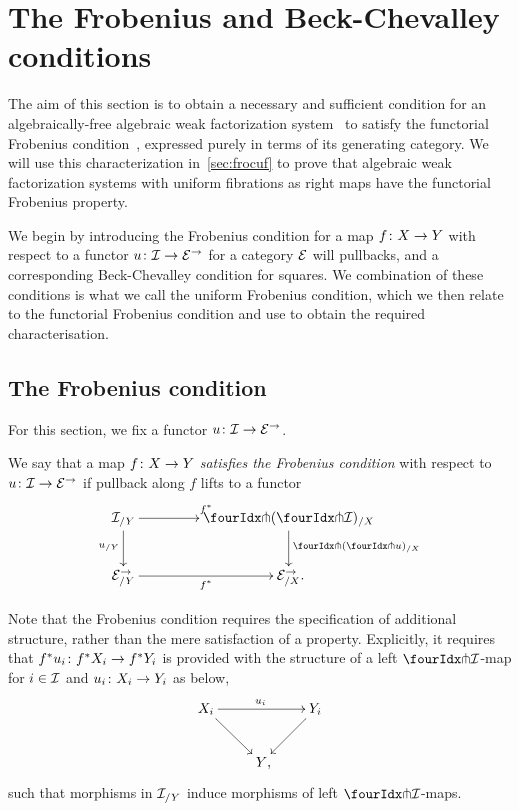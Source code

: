 \documentclass[reqno,10pt,a4paper,oneside,draft]{amsart}
\begin{document}
\section{The Frobenius and Beck-Chevalley conditions}
\label{sec:frobc}


The aim of this section is to obtain a necessary and sufficient condition for an algebraically-free algebraic weak
factorization system~\cite{garner:small-object-argument} to satisfy the functorial Frobenius condition~\cite{garner:topological-simplicial}, expressed purely in terms of its generating category. We will use this characterization 
in~\cref{sec:frocuf} to prove that algebraic weak factorization systems with uniform fibrations as right maps
have the functorial Frobenius property. 

We begin by introducing the Frobenius condition for a map $f \co X \to Y$ with respect to a functor $u \co \cal{I} \to \catE^\to$ for a category $\cal{E}$ will pullbacks, and a corresponding Beck-Chevalley condition for squares. We combination of these conditions is what we call the uniform Frobenius condition, which we then relate to the functorial Frobenius
condition and use to obtain the required characterisation. 


\subsection*{The Frobenius condition}

For this section, we fix a functor $u \co \cal{I} \to \catE^\to$.

\begin{definition} \label{thm:frobenius-def}
We say that a map $f \co X \to Y$ \emph{satisfies the Frobenius condition} with respect to $u \co \cal{I} \to \cal{E}^\to$ if pullback along $f$ lifts to a functor
\[
\xymatrix@C=1.5cm{
  \cal{I}_{/Y}
  \ar[r]^{f^*}
  \ar[d]_{u_{/Y}}
&
  \liftl{(\liftr{\cal{I}})}_{/X}
  \ar[d]^{\liftl{(\liftr{u})}_{/X}}
\\
  \catE_{/Y}^\to \ar[r]_{f^*}
&
  \catE_{/X}^\to
\rlap{.}}
\]
\end{definition}

\begin{remark} \label{frobenius-no-coherence}
Note that the Frobenius condition requires the specification of additional structure, rather than the mere satisfaction of a property. Explicitly,  it requires that $f^* u_i \co f^* X_i \to f^* Y_i$ is provided with the structure of a left $\liftr{\cal{I}}$-map for $i \in \cal{I}$ and $u_i \co X_i \to Y_i$ as below,
\[
\xymatrix{
  X_i
  \ar[dr]
  \ar[rr]^{u_i}
&&
  Y_i
  \ar[dl]
\\&
   Y
\rlap{,}}
\]
such that morphisms in $\cal{I}_{/Y}$ induce morphisms of left $\liftr{\cal{I}}$-maps.
\end{remark}
\end{document}

